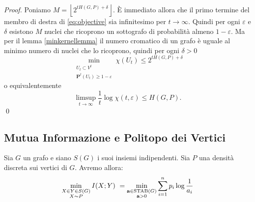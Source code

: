 \begin{proof}
	Poniamo \(M=\left\lfloor 2^{tH(G,P)+\delta}\right\rfloor\). È immediato allora che il primo termine del membro di destra di \eqref{eq:objective} sia infinitesimo per \(t\to \infty\). Quindi per ogni \(\varepsilon\) e \(\delta\) esistono \(M\) nuclei che ricoprono un sottografo di probabilità almeno \(1-\varepsilon\). Ma per il lemma \ref{minkernellemma} il numero cromatico di un grafo è uguale al minimo numero di nuclei che lo ricoprono, quindi per ogni \(\delta>0\)
	\[\min_{\substack{U_{t}\subset V^{t}\\
	\mathbf{P}^t(U_{t})\ge 1-\varepsilon}} \chi(U_{t})\le 2^{tH(G,P)+\delta}\]
	o equivalentemente
	\[\limsup_{t\to \infty}\frac{1}{t} \log{\chi({t,\varepsilon})}\le H(G,P).\]
	\qed 
\end{proof}

\subsection{Mutua Informazione e Politopo dei Vertici} 
\begin{theorem}[Simonyi]
	Sia \(G\) un grafo e siano \(S(G)\) i suoi insiemi indipendenti. Sia \(P\) una densità discreta sui vertici di \(G\). Avremo allora:
	\[\min_{\substack{X\in Y\in S(G) \\
	X\sim P}} I(X;Y)\ = \min_{\substack{\mathbf{a}\in \text{\text{STAB}}(G) \\
	\mathbf{a}>0}} \sum_{i=1}^n p_i\log{\frac{1}{a_i}}\]
\end{theorem}

